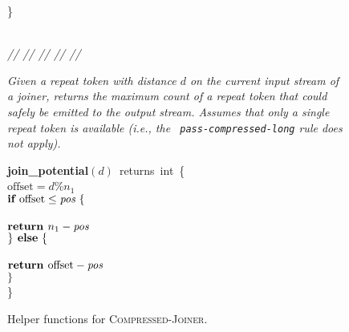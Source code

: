 \begin{figure}[t]
\}\\
~ \\
\begin{minipage}{0.1in}
\vspace{-1.75pt}
{\it // // // // //}
\end{minipage}
\begin{minipage}{3.23in}
{\it Given a repeat token with distance $d$ on the current input
  stream of a joiner, returns the maximum count of a repeat token that
  could safely be emitted to the output stream.  Assumes that only a
  single repeat token is available (i.e., the {\tt
    pass-compressed-long} rule does not apply).}
\end{minipage}
\mbox{\bf join\_potential}$(d)$~returns~int~\{\\
\tab$\mbox{offset} = d$\%$n_1$\\
\tab$\mbox{{\bf if~}} \mbox{offset} \leq \mbox{\it pos} ~\{$\\
\tab{}\\
\tab\tab$\mbox{\bf return~} n_1 - \mbox{\it pos}$\\
\tab$\} \mbox{\bf ~else} ~\{$\\
\tab{}\\
\tab\tab$\mbox{\bf return~} \mbox{offset} - \mbox{\it pos}$\\
\tab$\}$\\
\}
\caption{Helper functions for \textsc{Compressed-Joiner}.
\protect\label{fig:helper-joiner}}
\end{figure}
